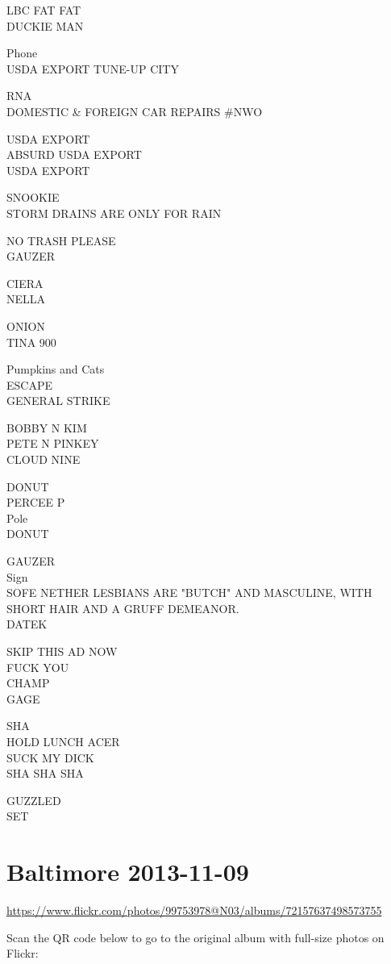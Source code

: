 \documentclass[10pt,letterpaper]{article}
\begin{document}
LBC FAT FAT\\
DUCKIE MAN

Phone\\
USDA EXPORT TUNE{-}UP CITY

RNA\\
DOMESTIC \& FOREIGN CAR REPAIRS \#NWO

USDA EXPORT\\
ABSURD USDA EXPORT\\
USDA EXPORT

SNOOKIE\\
STORM DRAINS ARE ONLY FOR RAIN

NO TRASH PLEASE\\
GAUZER

CIERA\\
NELLA

ONION\\
TINA 900

Pumpkins and Cats\\
ESCAPE\\
GENERAL STRIKE

BOBBY N KIM\\
PETE N PINKEY\\
CLOUD NINE

DONUT\\
PERCEE P\\
Pole\\
DONUT

GAUZER\\
Sign\\
SOFE NETHER LESBIANS ARE "BUTCH" AND MASCULINE, WITH SHORT HAIR AND A GRUFF DEMEANOR.\\
DATEK

SKIP THIS AD NOW\\
FUCK YOU\\
CHAMP\\
GAGE

SHA\\
HOLD LUNCH ACER\\
SUCK MY DICK\\
SHA SHA SHA

GUZZLED\\
SET
\pagebreak

\section*{Baltimore 2013-11-09}

\url{https://www.flickr.com/photos/99753978@N03/albums/72157637498573755}

Scan the QR code below to go to the original album with full-size photos on Flickr:
\end{document}
